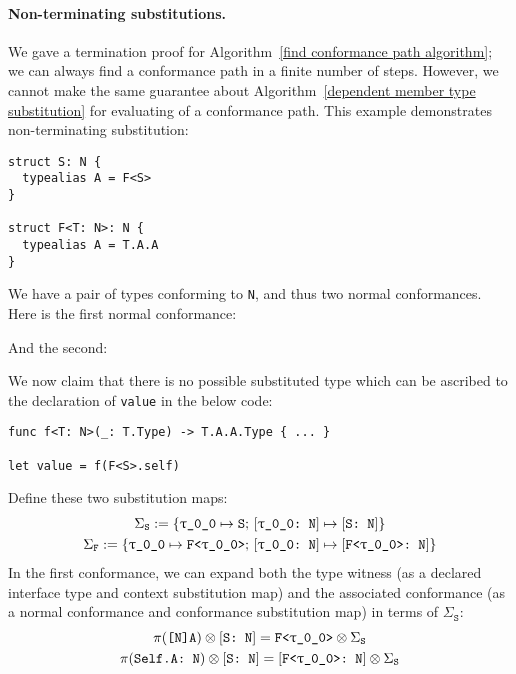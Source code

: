 \documentclass[../generics]{subfiles}
\begin{document}
\paragraph{Non-terminating substitutions.}
We gave a termination proof for Algorithm~\ref{find conformance path algorithm}; we can always find a conformance path in a finite number of steps. However, we cannot make the same guarantee about Algorithm~\ref{dependent member type substitution} for evaluating of a conformance path.  This example demonstrates non-terminating substitution:
\begin{Verbatim}
struct S: N {
  typealias A = F<S>
}

struct F<T: N>: N {
  typealias A = T.A.A
}
\end{Verbatim}
We have a pair of types conforming to \texttt{N}, and thus two normal conformances. Here is the first normal conformance:
\begin{quote}
\end{quote}
And the second:
\begin{quote}
\end{quote}
We now claim that there is no possible substituted type which can be ascribed to the declaration of \texttt{value} in the below code:
\begin{Verbatim}
func f<T: N>(_: T.Type) -> T.A.A.Type { ... }

let value = f(F<S>.self)
\end{Verbatim}
Define these two substitution maps:
\begin{gather*} \Sigma_\texttt{S}:=\{\texttt{\texttt{$\uptau$\_0\_0}} \mapsto \texttt{S};\,[\texttt{\texttt{$\uptau$\_0\_0}:~N}] \mapsto [\texttt{S:~N}]\}\\
\Sigma_\texttt{F} := \{\texttt{\texttt{$\uptau$\_0\_0}} \mapsto \texttt{F<\texttt{$\uptau$\_0\_0}>};\,[\texttt{\texttt{$\uptau$\_0\_0}:~N}] \mapsto [\texttt{F<\texttt{$\uptau$\_0\_0}>:~N}]\}
\end{gather*}
In the first conformance, we can expand both the type witness (as a declared interface type and context substitution map) and the associated conformance (as a normal conformance and conformance substitution map) in terms of $\Sigma_\texttt{S}$:
\begin{gather*}
\pi(\texttt{[N]A}) \otimes [\texttt{S:~N}] = \texttt{F<\texttt{$\uptau$\_0\_0}>}\otimes \Sigma_\texttt{S}\\
\pi(\texttt{Self.A:~N}) \otimes [\texttt{S:~N}] = [\texttt{F<\texttt{$\uptau$\_0\_0}>:~N}]\otimes \Sigma_\texttt{S}
\end{gather*}
\end{document}
